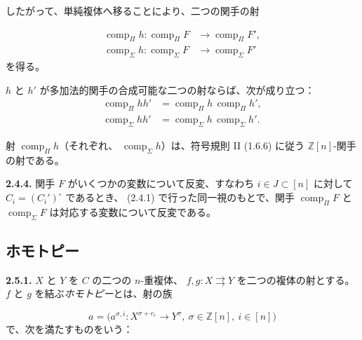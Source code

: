 \clearpage
{}%
したがって、単純複体へ移ることにより、二つの関手の射

\begin{equation}
  \begin{aligned}
    \operatorname{comp}_{\Pi}h\colon
      \operatorname{comp}_{\Pi}F
      &\longrightarrow \operatorname{comp}_{\Pi}F',\\
    \operatorname{comp}_{\Sigma}h\colon
      \operatorname{comp}_{\Sigma}F
      &\longrightarrow \operatorname{comp}_{\Sigma}F'
  \end{aligned}
  \tag{2.4.3.2}
\end{equation}
を得る。

$h$ と $h'$ が多加法的関手の合成可能な二つの射ならば、次が成り立つ：
\begin{equation*}
  \begin{aligned}
    \operatorname{comp}_{\Pi}hh'
      &=\operatorname{comp}_{\Pi}h\,\operatorname{comp}_{\Pi}h',\\
    \operatorname{comp}_{\Sigma}hh'
      &=\operatorname{comp}_{\Sigma}h\,\operatorname{comp}_{\Sigma}h'.
  \end{aligned}
\end{equation*}

射 $\operatorname{comp}_{\Pi}h$（それぞれ、
$\operatorname{comp}_{\Sigma}h$）は、符号規則 II (1.6.6) に従う
$\mathbb Z[n]$-関手の射である。

\noindent\textbf{2.4.4.}\quad
関手 $F$ がいくつかの変数について反変、すなわち
$i\in J\subset[n]$ に対して $C_i=(C_i')^\circ$ であるとき、
(2.4.1) で行った同一視のもとで、関手 $\operatorname{comp}_{\Pi}F$ と
$\operatorname{comp}_{\Sigma}F$ は対応する変数について反変である。

\subsection{ホモトピー}

\noindent\textbf{2.5.1.}\quad
$X$ と $Y$ を $C$ の二つの $n$-重複体、
$f,g\colon X\rightrightarrows Y$ を二つの複体の射とする。
$f$ と $g$ を結ぶ\emph{ホモトピー}とは、射の族

\begin{equation*}
  a=\bigl(a^{\sigma,i}\colon X^{\sigma+e_i}\longrightarrow Y^\sigma,
    \ \sigma\in\mathbb Z[n],\ i\in[n]\bigr)
\end{equation*}
で、次を満たすものをいう：

